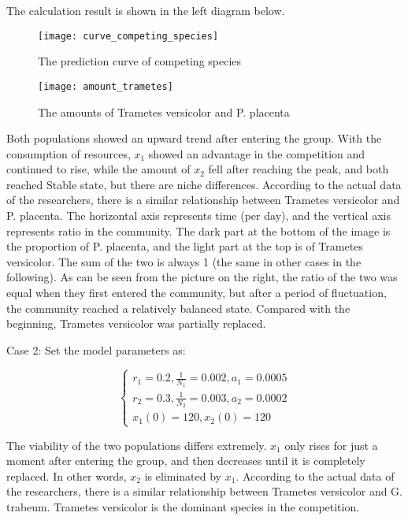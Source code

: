\documentclass{mcmthesis}
\begin{document}
The calculation result is shown in the left diagram below.

\begin{figure}[H]
  \centering
  \subfigure
  {
    \begin{minipage}[b]{.4\linewidth}
      \centering
      \texttt{[image: curve\_competing\_species]}
      \caption{The prediction curve of competing species}
    \end{minipage}
  }\quad \quad \quad \quad \quad \quad
  \subfigure
  {
    \begin{minipage}[b]{.4\linewidth}
      \centering
      \texttt{[image: amount\_trametes]}
      \caption{The amounts of Trametes versicolor and P. placenta}
    \end{minipage}
  }
\end{figure}

Both populations showed an upward trend after entering the group. With the consumption of resources, $ x_1 $ showed an advantage in the competition and continued to rise, while the amount of $ x_2 $ fell after reaching the peak, and both reached Stable state, but there are niche differences. According to the actual data of the researchers, there is a similar relationship between Trametes versicolor and P. placenta. The horizontal axis represents time (per day), and the vertical axis represents ratio in the community. The dark part at the bottom of the image is the proportion of P. placenta, and the light part at the top is of Trametes versicolor. The sum of the two is always 1 (the same in other cases in the following). As can be seen from the picture on the right, the ratio of the two was equal when they first entered the community, but after a period of fluctuation, the community reached a relatively balanced state. Compared with the beginning, Trametes versicolor was partially replaced.

Case 2: Set the model parameters as: 

\begin{equation}
  \left\{\begin{array}{l}
    r_{1}=0.2, \frac{1}{N_{1}}=0.002, a_{1}=0.0005 \\
    r_{2}=0.3, \frac{1}{N_{2}}=0.003, a_{2}=0.0002 \\
    x_{1}(0)=120, x_{2}(0)=120
    \end{array}\right.
  \label{alg_33}
\end{equation}

The viability of the two populations differs extremely. $ x_1 $ only rises for just a moment after entering the group, and then decreases until it is completely replaced. In other words, $ x_2 $ is eliminated by $ x_1 $. According to the actual data of the researchers\cite{hiscox2018fungus}, there is a similar relationship between Trametes versicolor and G. trabeum. Trametes versicolor is the dominant species in the competition.
\end{document}
